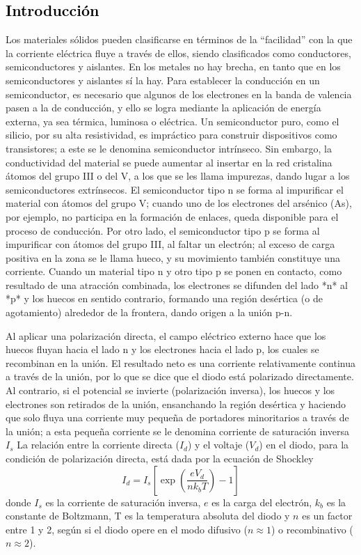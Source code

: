 \textcolor{black}{\section{Introducción}}
Los materiales sólidos pueden clasificarse en términos de la “facilidad” con la que la corriente eléctrica fluye a través de ellos, siendo clasificados como conductores, semiconductores y aislantes. En los metales no hay brecha, en tanto que en los semiconductores y aislantes sí la hay. Para establecer la conducción en un semiconductor,  es necesario que algunos de los electrones en la banda de valencia pasen a la de conducción, y ello se logra mediante la aplicación de energía externa, ya sea térmica, luminosa o eléctrica.  Un semiconductor puro, como el silicio, por su alta resistividad, es impráctico para construir dispositivos como transistores; a este se le denomina semiconductor intrínseco. Sin embargo, la conductividad del material se puede aumentar al insertar en la red cristalina átomos del grupo III o del V, a los que se les llama impurezas, dando lugar a los semiconductores extrínsecos. \cite{Uj}
El semiconductor tipo n se forma al impurificar el material con átomos del grupo V; cuando uno de los electrones del arsénico (As), por ejemplo, no participa en la formación de enlaces, queda disponible para el proceso de conducción. Por otro lado, el semiconductor tipo p se forma al impurificar con átomos del grupo III, al faltar un electrón; al exceso de carga positiva en la zona se le llama hueco, y su movimiento también constituye una corriente.
Cuando un material tipo n y otro tipo p se ponen en contacto, como resultado de una atracción combinada, los electrones se difunden del lado *n* al *p* y los huecos en sentido contrario, formando una región desértica (o de agotamiento) alrededor de la frontera, dando origen a la unión p-n.\cite{Uj}

Al aplicar una polarización directa, el campo eléctrico externo hace que los huecos fluyan hacia el lado n y los electrones hacia el lado p, los cuales se recombinan en la unión. El resultado neto es una corriente relativamente continua a través de la unión, por lo que se dice que el diodo está polarizado directamente. Al contrario, si el potencial se invierte (polarización inversa), los huecos y los electrones son retirados de la unión, ensanchando la región desértica y haciendo que solo fluya una corriente muy pequeña de portadores minoritarios a través de la unión; a esta pequeña corriente se le denomina corriente de saturación inversa $I_s$
La relación entre la corriente directa ($I_d$) y el voltaje ($V_d$) en el diodo, para la condición de polarización directa, está dada por la ecuación de Shockley 
\begin{equation}
	I_d = I_s \left[ \exp\left(\frac{eV_d}{nk_b T}\right) - 1 \right]
	\label{Shockley1}
\end{equation}
donde $I_s$ es la corriente de saturación inversa, $e$ es la carga del electrón, $k_b$ es la constante de Boltzmann, T es la temperatura absoluta del diodo y $n$ es un factor entre 1 y 2, según si el diodo 
opere en el modo difusivo ($n \approx 1$) o recombinativo ($n \approx 2$).\cite{Uj}
\noindent 